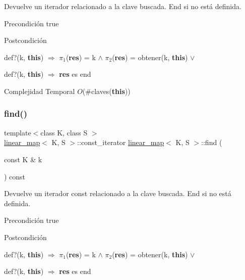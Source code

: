 Devuelve un iterador relacionado a la clave buscada. End si no está definida. 

\begin{DoxyPrecond}{Precondición}
true 
\end{DoxyPrecond}
\begin{DoxyPostcond}{Postcondición}

\begin{DoxyItemize}
\item def?(k, {\bfseries this}) $\Rightarrow$ $\pi_1$({\bfseries res}) = k $\land$ $\pi_2$({\bfseries res}) = obtener(k, {\bfseries this}) $\lor$
\item def?(k, {\bfseries this}) $\Rightarrow$ {\bfseries res} es end
\end{DoxyItemize}
\end{DoxyPostcond}

\begin{DoxyDescription}
\item[Complejidad Temporal]$O$(\#claves({\bfseries this}))
\end{DoxyDescription}\mbox{\label{classlinear__map_a99493e350f97f5c3932840a28406fd37}} 
\subsubsection{\texorpdfstring{find()}{find()}\hspace{0.1cm}{\footnotesize\ttfamily [2/2]}}
{\footnotesize\ttfamily template$<$class K, class S $>$ \\
\mbox{\hyperlink{classlinear__map}{linear\+\_\+map}}$<$ K, S $>$\+::const\+\_\+iterator \mbox{\hyperlink{classlinear__map}{linear\+\_\+map}}$<$ K, S $>$\+::find (\begin{DoxyParamCaption}\item[{const K \&}]{k }\end{DoxyParamCaption}) const}



Devuelve un iterador const relacionado a la clave buscada. End si no está definida. 

\begin{DoxyPrecond}{Precondición}
true 
\end{DoxyPrecond}
\begin{DoxyPostcond}{Postcondición}

\begin{DoxyItemize}
\item def?(k, {\bfseries this}) $\Rightarrow$ $\pi_1$({\bfseries res}) = k $\land$ $\pi_2$({\bfseries res}) = obtener(k, {\bfseries this}) $\lor$
\item def?(k, {\bfseries this}) $\Rightarrow$ {\bfseries res} es end
\end{DoxyItemize}
\end{DoxyPostcond}

